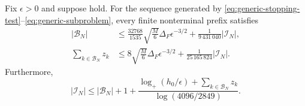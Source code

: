 \documentclass{article}
\begin{document}
\begin{lemma}
\label{lem:budgets}
Fix $\epsilon>0$ and suppose
 hold.  For the sequence generated
by \eqref{eq:generic-stopping-test}--\eqref{eq:generic-subproblem},
every finite nonterminal prefix satisfies
\begin{subequations}\label{eq:boundary-budgets}
\begin{align}
 |\mathcal B_N|
 &\le\frac{32768}{1535}\sqrt{\frac M6}\Delta_F\epsilon^{-3/2}
      +\frac1{9\,431\,040}|\mathcal I_N|,
      \label{eq:boundary-count}\\
 \sum_{k\in\mathcal B_N}z_k
 &\le8\sqrt{\frac M6}\Delta_F\epsilon^{-3/2}
      +\frac1{25\,165\,824}|\mathcal I_N|.
      \label{eq:z-budget}
\end{align}
\end{subequations}
Furthermore,
\begin{equation}\label{eq:interior-budget}
 |\mathcal I_N|
 \le |\mathcal B_N|+1+
 \frac{\log_+(h_0/\epsilon)+\sum_{k\in\mathcal B_N}z_k}
      {\log(4096/2849)}.
\end{equation}
\end{lemma}
\end{document}
